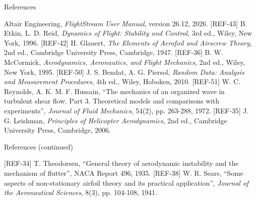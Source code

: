 \documentclass[aspectratio=169,11pt]{beamer}
\begin{document}
\begin{frame}{References}
\begin{reflist}
   
   Altair Engineering, \emph{FlightStream User Manual}, version 26.12, 2026.
   \recordsref
   
   [REF-43] B. Etkin, L. D. Reid, \emph{Dynamics of Flight: Stability and
        Control}, 3rd ed., Wiley, New York, 1996.
   [REF-42] H. Glauert, \emph{The Elements of Aerofoil and Airscrew Theory}, 2nd
        ed., Cambridge University Press, Cambridge, 1947.
   [REF-36] B. W. McCormick, \emph{Aerodynamics, Aeronautics, and Flight
        Mechanics}, 2nd ed., Wiley, New York, 1995.
   [REF-50] J. S. Bendat, A. G. Piersol, \emph{Random Data: Analysis and
        Measurement Procedures}, 4th ed., Wiley, Hoboken, 2010.
   [REF-51] W. C. Reynolds, A. K. M. F. Hussain, ``The mechanics of an organized
        wave in turbulent shear flow. Part 3. Theoretical models and
        comparisons with experiments'', \emph{Journal of Fluid Mechanics},
        54(2), pp. 263-288, 1972.
   [REF-35] J. G. Leishman, \emph{Principles of Helicopter Aerodynamics}, 2nd
        ed., Cambridge University Press, Cambridge, 2006.
\end{reflist}
\end{frame}

\begin{frame}{References (continued)}
\begin{reflist}
  \setcounter{enumi}{10}
   [REF-34] T. Theodorsen, ``General theory of aerodynamic instability and the
        mechanism of flutter'', NACA Report 496, 1935.
   [REF-38] W. R. Sears, ``Some aspects of non-stationary airfoil theory and its
        practical application'', \emph{Journal of the Aeronautical Sciences},
        8(3), pp. 104-108, 1941.
\end{reflist}
\end{frame}
\end{document}
